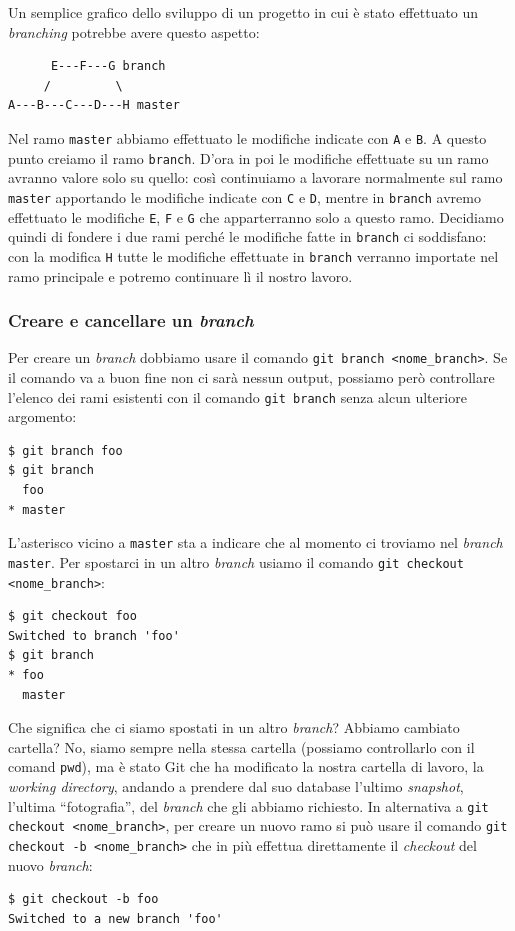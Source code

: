 \documentclass[a4paper,12pt,oneside]{article}
\begin{document}
Un semplice grafico dello sviluppo di un progetto in cui è stato effettuato un
\emph{branching} potrebbe avere questo aspetto:
\begin{lstlisting}
      E---F---G branch
     /         \
A---B---C---D---H master
\end{lstlisting}
Nel ramo \lstinline|master| abbiamo effettuato le modifiche indicate con
\lstinline|A| e \lstinline|B|. A questo punto creiamo il ramo
\lstinline|branch|. D'ora in poi le modifiche effettuate su un ramo avranno
valore solo su quello: così continuiamo a lavorare normalmente sul ramo
\lstinline|master| apportando le modifiche indicate con \lstinline|C| e
\lstinline|D|, mentre in \lstinline|branch| avremo effettuato le modifiche
\lstinline|E|, \lstinline|F| e \lstinline|G| che apparterranno solo a questo ramo.
Decidiamo quindi di fondere i due rami perché le modifiche fatte in
\lstinline|branch| ci soddisfano: con la modifica \lstinline|H| tutte le modifiche
effettuate in \lstinline|branch| verranno importate nel ramo principale e potremo
continuare lì il nostro lavoro.

\subsubsection{Creare e cancellare un \emph{branch}}
Per creare un \emph{branch} dobbiamo usare il comando
\lstinline|git branch <nome_branch>|. Se il comando va a buon fine non ci sarà
nessun output, possiamo però controllare l'elenco dei rami esistenti con il comando
\lstinline|git branch| senza alcun ulteriore argomento:
\begin{lstlisting}
$ git branch foo
$ git branch
  foo
* master
\end{lstlisting}
L'asterisco vicino a \lstinline|master| sta a indicare che al momento ci troviamo
nel \emph{branch} \lstinline|master|. Per spostarci in un altro \emph{branch}
usiamo il comando \lstinline|git checkout <nome_branch>|:
\begin{lstlisting}
$ git checkout foo
Switched to branch 'foo'
$ git branch 
* foo
  master
\end{lstlisting}
Che significa che ci siamo spostati in un altro \emph{branch}? Abbiamo cambiato
cartella? No, siamo sempre nella stessa cartella (possiamo controllarlo con il
comand \lstinline|pwd|), ma è stato Git che ha modificato la nostra cartella di
lavoro, la \emph{working directory}, andando a prendere dal suo database l'ultimo
\emph{snapshot}, l'ultima ``fotografia'', del \emph{branch} che gli abbiamo
richiesto. In alternativa a \lstinline|git checkout <nome_branch>|, per creare
un nuovo ramo si può usare il comando \lstinline|git checkout -b <nome_branch>|
che in più effettua direttamente il \emph{checkout} del nuovo \emph{branch}:
\begin{lstlisting}
$ git checkout -b foo
Switched to a new branch 'foo'
\end{lstlisting}
\end{document}
